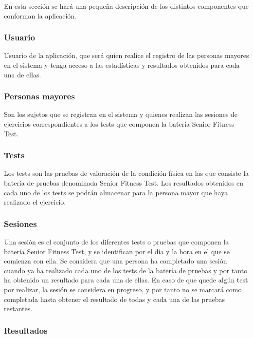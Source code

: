 En esta sección se hará una pequeña descripción de los distintos componentes que conforman la aplicación.

\subsubsection{Usuario}

Usuario de la aplicación, que será quien realice el registro de las personas mayores en el sistema y tenga acceso a las estadísticas y resultados obtenidos para cada una de ellas.

\subsubsection{Personas mayores}

Son los sujetos que se registran en el sistema y quienes realizan las sesiones de ejercicios correspondientes a los tests que componen la batería Senior Fitness Test.

\subsubsection{Tests}

Los tests son las pruebas de valoración de la condición física en las que consiste la batería de pruebas denominada Senior Fitness Test. Los resultados obtenidos en cada uno de los tests se podrán almacenar para la persona mayor que haya realizado el ejercicio.

\subsubsection{Sesiones}

Una sesión es el conjunto de los diferentes tests o pruebas que componen la batería Senior Fitness Test, y se identifican por el día y la hora en el que se comienza con ella. Se considera que una persona ha completado una sesión cuando ya ha realizado cada uno de los tests de la batería de pruebas y por tanto ha obtenido un resultado para cada una de ellas. En caso de que quede algún test por realizar, la sesión se considera en progreso, y por tanto no se marcará como completada hasta obtener el resultado de todas y cada una de las pruebas restantes.

\subsubsection{Resultados}

